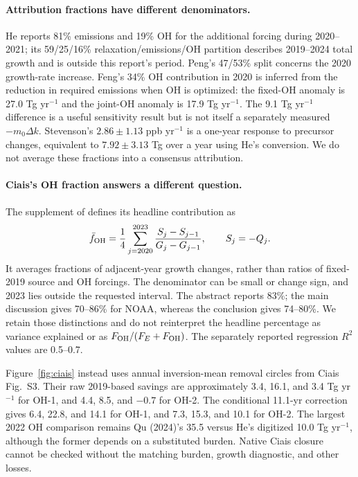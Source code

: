 \documentclass[11pt]{article}
\begin{document}
\paragraph{Attribution fractions have different denominators.}
He reports 81\% emissions and 19\% OH for the additional forcing during
2020--2021; its 59/25/16\% relaxation/emissions/OH partition describes
2019--2024 total growth and is outside this report's period. Peng's 47/53\%
split concerns the 2020 growth-rate increase. Feng's 34\% OH contribution
in 2020 is inferred from the reduction in required emissions when OH is
optimized: the fixed-OH anomaly is 27.0 Tg yr$^{-1}$ and the joint-OH
anomaly is 17.9 Tg yr$^{-1}$. The 9.1 Tg yr$^{-1}$ difference is a useful
sensitivity result but is not itself a separately measured $-m_0\Delta k$.
Stevenson's $2.86\pm1.13$ ppb yr$^{-1}$ is a one-year response to precursor
changes, equivalent to $7.92\pm3.13$ Tg over a year using He's conversion.
We do not average these fractions into a consensus attribution.

\paragraph{Ciais's OH fraction answers a different question.}
The supplement of \citet{ciaisetal2026} defines its headline contribution as
\begin{equation}\label{eq:ciaisfraction}
\bar f_{\rm OH}=\frac{1}{4}\sum_{j=2020}^{2023}
\frac{S_j-S_{j-1}}{G_j-G_{j-1}},\qquad S_j=-Q_j.
\end{equation}
It averages fractions of adjacent-year growth changes, rather than ratios
of fixed-2019 source and OH forcings. The denominator can be small or change
sign, and 2023 lies outside the requested interval. The abstract reports
83\%; the main discussion gives 70--86\% for NOAA, whereas the conclusion
gives 74--80\%. We retain those distinctions and do not reinterpret the
headline percentage as variance explained or as $F_{\rm OH}/(F_E+F_{\rm OH})$.
The separately reported regression $R^2$ values are 0.5--0.7.

Figure~\ref{fig:ciais} instead uses annual inversion-mean removal circles
from Ciais Fig.~S3. Their raw 2019-based savings are approximately 3.4, 16.1,
and 3.4 Tg yr$^{-1}$ for OH-1, and 4.4, 8.5, and $-0.7$ for OH-2.
The conditional 11.1-yr correction gives 6.4, 22.8, and 14.1 for OH-1,
and 7.3, 15.3, and 10.1 for OH-2. The largest 2022 OH comparison remains
Qu (2024)'s 35.5 versus He's digitized 10.0 Tg yr$^{-1}$, although the former
depends on a substituted burden. Native Ciais closure cannot be checked
without the matching burden, growth diagnostic, and other losses.
\end{document}
